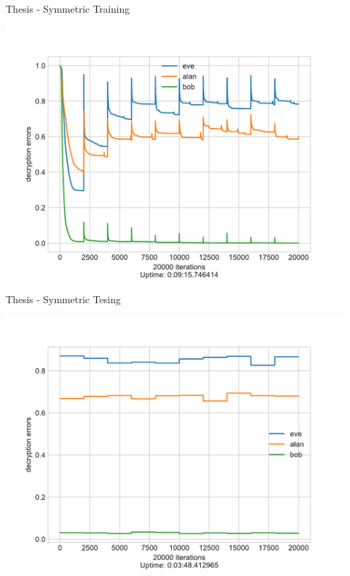 \documentclass[a4paper, 12pt]{report}
\begin{document}
\begin{blockfigure}{Thesis - Symmetric Training}
	\begin{center}
		\includegraphics[width = 0.95\textwidth]{neurencoder-symmetric-training}
	\end{center}
\end{blockfigure}
\begin{blockfigure}{Thesis - Symmetric Tesing}
	\begin{center}
		\includegraphics[width = 0.95\textwidth]{neurencoder-symmetric-testing}
	\end{center}
\end{blockfigure}
\newpage
\end{document}
